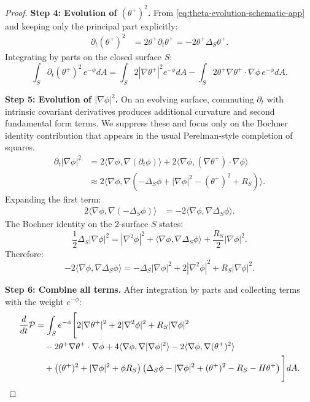 \begin{proof}
\textbf{Step 4: Evolution of $(\theta^+)^2$.}
From \eqref{eq:theta-evolution-schematic-app} and keeping only the principal part explicitly:
\begin{align}
\partial_t(\theta^+)^2 &= 2\theta^+\partial_t\theta^+ = -2\theta^+\Delta_S\theta^+.
\end{align}
Integrating by parts on the closed surface $S$:
\begin{equation}
\int_S \partial_t(\theta^+)^2 \, e^{-\phi}dA = \int_S 2|\nabla\theta^+|^2 e^{-\phi}dA - \int_S 2\theta^+\nabla\theta^+\cdot\nabla\phi \, e^{-\phi}dA.
\label{eq:theta-sq-evol-app}
\end{equation}

\textbf{Step 5: Evolution of $|\nabla\phi|^2$.}
On an evolving surface, commuting $\partial_t$ with intrinsic covariant derivatives produces additional curvature and second fundamental form terms. We suppress these and focus only on the Bochner identity contribution that appears in the usual Perelman-style completion of squares.
\begin{align}
\partial_t|\nabla\phi|^2 &= 2\langle\nabla\phi, \nabla(\partial_t\phi)\rangle + 2\langle\nabla\phi, (\nabla\theta^+)\cdot\nabla\phi\rangle \\
&\approx 2\langle\nabla\phi, \nabla(-\Delta_S\phi + |\nabla\phi|^2 - (\theta^+)^2 + R_S)\rangle.
\end{align}
Expanding the first term:
\begin{align}
2\langle\nabla\phi, \nabla(-\Delta_S\phi)\rangle &= -2\langle\nabla\phi, \nabla\Delta_S\phi\rangle.
\end{align}
The Bochner identity on the 2-surface $S$ states:
\begin{equation}
\frac{1}{2}\Delta_S|\nabla\phi|^2 = |\nabla^2\phi|^2 + \langle\nabla\phi, \nabla\Delta_S\phi\rangle + \frac{R_S}{2}|\nabla\phi|^2.
\end{equation}
Therefore:
\begin{equation}
-2\langle\nabla\phi, \nabla\Delta_S\phi\rangle = -\Delta_S|\nabla\phi|^2 + 2|\nabla^2\phi|^2 + R_S|\nabla\phi|^2.
\end{equation}

\textbf{Step 6: Combine all terms.}
After integration by parts and collecting terms with the weight $e^{-\phi}$:
\begin{align}
\frac{d}{dt}\mathcal{P} &= \int_S e^{-\phi}\Bigg[2|\nabla\theta^+|^2 + 2|\nabla^2\phi|^2 + R_S|\nabla\phi|^2 \notag\\
&\quad - 2\theta^+\nabla\theta^+\cdot\nabla\phi + 4\langle\nabla\phi, \nabla|\nabla\phi|^2\rangle - 2\langle\nabla\phi, \nabla(\theta^+)^2\rangle \notag\\
&\quad + \left((\theta^+)^2 + |\nabla\phi|^2 + \phi R_S\right)\left(\Delta_S\phi - |\nabla\phi|^2 + (\theta^+)^2 - R_S - H\theta^+\right)\Bigg]dA.
\label{eq:P-evolution-full-app}
\end{align}


\end{proof}
